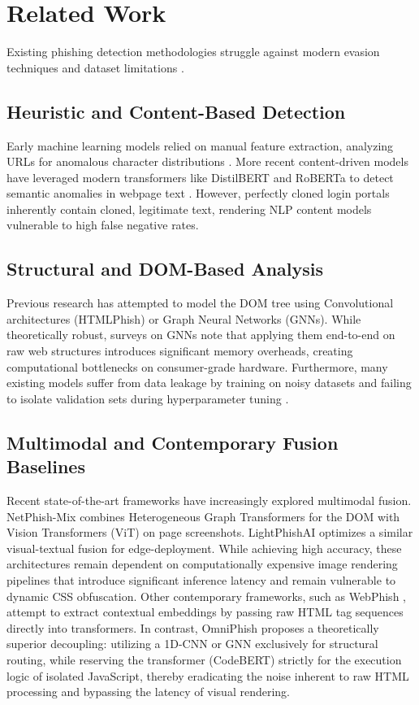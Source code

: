 \documentclass[conference]{IEEEtran}
\begin{document}
\section{Related Work}
Existing phishing detection methodologies struggle against modern evasion techniques and dataset limitations \cite{adebowale}.

\subsection{Heuristic and Content-Based Detection}
Early machine learning models relied on manual feature extraction, analyzing URLs for anomalous character distributions \cite{sahingoz}. More recent content-driven models have leveraged modern transformers like DistilBERT and RoBERTa to detect semantic anomalies in webpage text \cite{phishbert_2025}. However, perfectly cloned login portals inherently contain cloned, legitimate text, rendering NLP content models vulnerable to high false negative rates.

\subsection{Structural and DOM-Based Analysis}
Previous research has attempted to model the DOM tree using Convolutional architectures (HTMLPhish) \cite{htmlphish} or Graph Neural Networks (GNNs). While theoretically robust, surveys on GNNs \cite{wu_gnn_survey} note that applying them end-to-end on raw web structures introduces significant memory overheads, creating computational bottlenecks on consumer-grade hardware. Furthermore, many existing models suffer from data leakage by training on noisy datasets and failing to isolate validation sets during hyperparameter tuning \cite{dos_and_donts}.

\subsection{Multimodal and Contemporary Fusion Baselines}
Recent state-of-the-art frameworks have increasingly explored multimodal fusion. NetPhish-Mix \cite{netphishmix} combines Heterogeneous Graph Transformers for the DOM with Vision Transformers (ViT) on page screenshots. LightPhishAI \cite{lightphishai} optimizes a similar visual-textual fusion for edge-deployment. While achieving high accuracy, these architectures remain dependent on computationally expensive image rendering pipelines that introduce significant inference latency and remain vulnerable to dynamic CSS obfuscation. Other contemporary frameworks, such as WebPhish \cite{webphish}, attempt to extract contextual embeddings by passing raw HTML tag sequences directly into transformers. In contrast, OmniPhish proposes a theoretically superior decoupling: utilizing a 1D-CNN or GNN exclusively for structural routing, while reserving the transformer (CodeBERT) strictly for the execution logic of isolated JavaScript, thereby eradicating the noise inherent to raw HTML processing and bypassing the latency of visual rendering.
\end{document}
